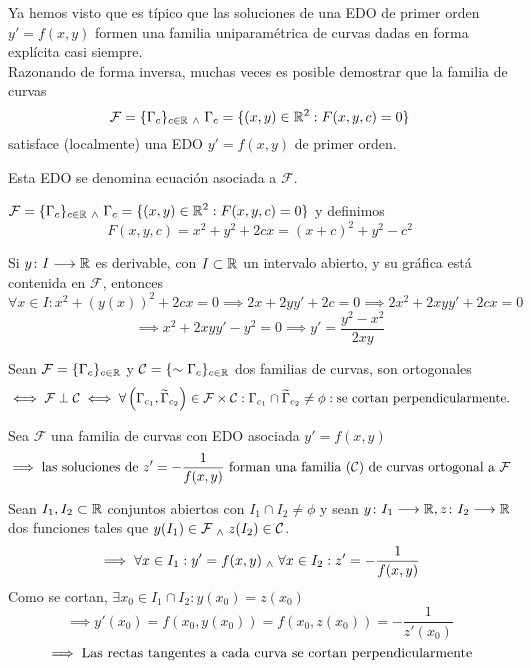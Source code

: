 Ya hemos visto que es típico que las soluciones de una EDO de primer orden $y'=f(x,y)$ formen una familia uniparamétrica de curvas dadas en forma explícita casi siempre. \\
\indent Razonando de forma inversa, muchas veces es posible demostrar que la familia de curvas
\[\mathcal{F} = \{\Gamma_c\}_{c\in \mathbb{R}} \; _{\wedge} \; \Gamma_c=\{(x,y)\in \mathbb{R}^2:F(x,y,c)=0\}\]
satisface (localmente) una EDO $y'=f(x,y)$ de primer orden.
\begin{defn}
	Esta EDO se denomina ecuación asociada a $\mathcal{F}$.
\end{defn}

\begin{ejem} \label{circums}
	$\displaystyle \mathcal{F} = \{\Gamma_c\}_{c\in \mathbb{R}} \; _{\wedge} \; \Gamma_c=\{(x,y)\in \mathbb{R}^2:F(x,y,c)=0\}$ y definimos 
	\[F(x,y,c)=x^2+y^2+2cx=(x+c)^2+y^2-c^2\] \begin{figure}[htbp]
		\centering
		\vspace{-0.7cm} %
		
		\vspace{-0.2cm} %
	\end{figure}
	
	\noindent Si $y \colon I \longrightarrow \mathbb{R}$ es derivable, con $I\subset\mathbb{R}$ un intervalo abierto, y su gráfica está contenida en $\mathcal{F}$, entonces $\forall x \in I : x^2+(y(x))^2+2cx=0 \implies 2x+2yy'+2c=0\implies 2x^2+2xyy'+2cx=0$
	\[\implies x^2+2xyy'-y^2=0 \implies y'=\frac{y^2-x^2}{2xy}\]
\end{ejem}

\begin{defn}
	Sean $\mathcal{F}=\{\Gamma_c\}_{c\in \mathbb{R}}$ y $\mathcal{C}=\{\sim{\Gamma_c}\}_{c\in \mathbb{R}}$ dos familias de curvas, son ortogonales
	\[\iff \mathcal{F} \perp \mathcal{C}\iff \forall \left(\Gamma_{c_1}, \widetilde{\Gamma}_{c_2}\right) \in \mathcal{F}\times\mathcal{C}: \Gamma_{c_1}\cap\widetilde{\Gamma}_{c_2}\ne \phi : \text{se cortan perpendicularmente.}\]
\end{defn}

\begin{prop}
	Sea $\mathcal{F}$ una familia de curvas con EDO asociada $y'=f(x,y)$
	\[\implies \text{las soluciones de } z'=-\frac{1}{f(x,y)} \text{ forman una familia $(\mathcal{C})$ de curvas ortogonal a } \mathcal{F}\]
	\begin{dem}
		Sean $I_1, I_2 \subset \mathbb{R}$ conjuntos abiertos con $I_1\cap I_2\ne \phi$ y sean $y \colon I_1 \longrightarrow \mathbb{R}, z \colon I_2 \longrightarrow \mathbb{R}$ dos funciones tales que $y(I_1)\in \mathcal{F} \; _{\wedge} \; z(I_2)\in \mathcal{C}$.
		\[\implies \forall x\in I_1 : y'=f(x,y) \; _{\wedge} \; \forall x\in I_2 : z'=-\frac{1}{f(x,y)}\]
		Como se cortan, $\exists x_0\in I_1\cap I_2 : y(x_0)=z(x_0)$
		\[\implies y'(x_0)=f(x_0, y(x_0))=f(x_0, z(x_0))=-\frac{1}{z'(x_0)}\]
		\[\implies \text{Las rectas tangentes a cada curva se cortan perpendicularmente}\]
	\end{dem}
\end{prop}

